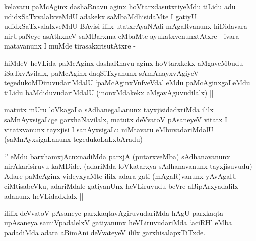 \begin{artha}
kelavaru paMcAginx dashaRnavu aginx hoVtarxdasutxtiyeMdu tiLidu adu
udidxSaTxvalalxveMdU adakekx saMbaMdhisidaMte I gatiyU
udidxSaTxvalalxveMdU BAvisi ililx utatxrAyaNAdi mAgaRvanunx hiDidavara
nirUpaNeye asAthxneV saMBarxma eMbaMte ayukatxvenunxtAtxre - ivara
matavanunx I muMde tirasakxrisutAtxre -
\end{artha}

\begin{artha}
hiMdeV heVLida paMcAginx dashaRnavu aginx hoVtarxkekx aMgaveMbudu
iSaTxvAvilalx, paMcAginx daqSiTxyanunx sAmAnayxvAgiyeV
tegedukoMDiruvudariMdalU `paMcAginxVnfveVda' eMdu paMcAginxgaLeMdu
tiLidu baMdiduvudariMdalU (inonxMdakekx aMgavAguvudilalx) ||
\end{artha}

\begin{artha}
matutx mUru loVkagaLa sAdhanegaLanunx tayxjisidadxriMda ililx
saMnAyxsigaLige garxhaNavilalx, matutx deVvatoV pAsaneyeV vitatx I
vitatxvanunx tayxjisi I sanAyxsigaLu niMtavaru eMbuvadariMdalU
(saMnAyxsigaLanunx tegedukoLaLxbAradu) ||
\end{artha}


\begin{artha}
`\stext' eMdu barxhamxjAcnxnadiMda parxjA (putarxveMba) sAdhanavanunx
  nirAkarisiruvu kaMDide. (adariMda loVkatarxya sAdhanavanunx
  tayxjisuvudu) Adare paMcAginx videyxyaMte ililx adara gati
  (mAgaR)vanunx yAvAgalU ciMtisabeVku, adariMdale gatiyanUnx
  heVLiruvudu beVre aBipArxyadalilx adanunx heVLidadxlalx ||
\end{artha}


\begin{artha}
ililix deVvatoV pAsaneye parxkaqtavAgiruvudariMda hAgU parxkaqta
upAsaneya samiVpadalelxV gatiyanunx heVLiruvudariMda `aciRH' eMba
padadiMda adara aBimAni deVvateyeV ililx garxhisalapxTiTxde. 
\end{artha}


